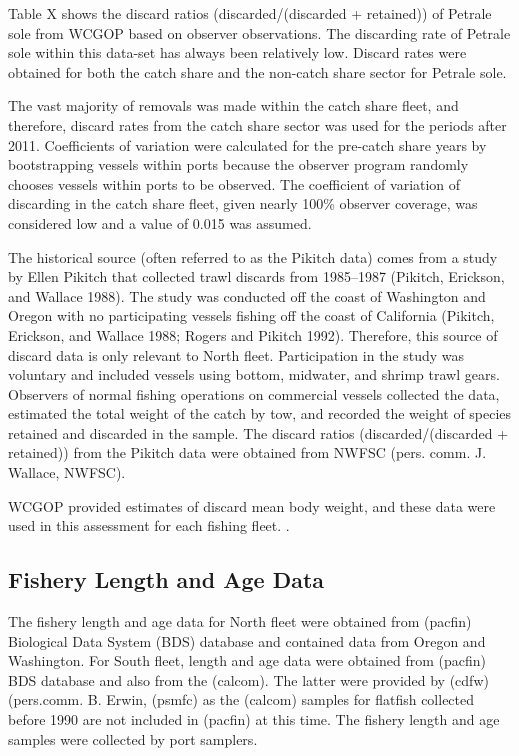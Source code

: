 \documentclass[
]{scrartcl}
\begin{document}
Table X shows the discard ratios (discarded/(discarded + retained)) of
Petrale sole from WCGOP based on observer observations. The discarding
rate of Petrale sole within this data-set has always been relatively
low. Discard rates were obtained for both the catch share and the
non-catch share sector for Petrale sole.

The vast majority of removals was made within the catch share fleet, and
therefore, discard rates from the catch share sector was used for the
periods after 2011. Coefficients of variation were calculated for the
pre-catch share years by bootstrapping vessels within ports because the
observer program randomly chooses vessels within ports to be observed.
The coefficient of variation of discarding in the catch share fleet,
given nearly 100\% observer coverage, was considered low and a value of
0.015 was assumed.

The historical source (often referred to as the Pikitch data) comes from
a study by Ellen Pikitch that collected trawl discards from 1985--1987
(Pikitch, Erickson, and Wallace 1988). The study was conducted off the
coast of Washington and Oregon with no participating vessels fishing off
the coast of California (Pikitch, Erickson, and Wallace 1988; Rogers and
Pikitch 1992). Therefore, this source of discard data is only relevant
to North fleet. Participation in the study was voluntary and included
vessels using bottom, midwater, and shrimp trawl gears. Observers of
normal fishing operations on commercial vessels collected the data,
estimated the total weight of the catch by tow, and recorded the weight
of species retained and discarded in the sample. The discard ratios
(discarded/(discarded + retained)) from the Pikitch data were obtained
from NWFSC (pers. comm. J. Wallace, NWFSC).

WCGOP provided estimates of discard mean body weight, and these data
were used in this assessment for each fishing fleet. .

\subsection{Fishery Length and Age
Data}\label{fishery-length-and-age-data}

The fishery length and age data for North fleet were obtained from
(pacfin) Biological Data System (BDS) database and contained data from
Oregon and Washington. For South fleet, length and age data were
obtained from (pacfin) BDS database and also from the (calcom). The
latter were provided by (cdfw) (pers.comm. B. Erwin, (psmfc) as the
(calcom) samples for flatfish collected before 1990 are not included in
(pacfin) at this time. The fishery length and age samples were collected
by port samplers.
\end{document}

